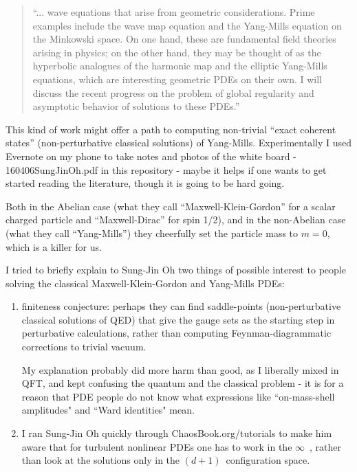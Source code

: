\begin{description}
\begin{quote}
``... wave equations that arise from geometric
considerations. Prime examples include the wave map equation and
the Yang-Mills equation on the Minkowski space. On one hand, these
are fundamental field theories arising in physics; on the other hand,
they may be thought of as the hyperbolic analogues of the harmonic map
and the elliptic Yang-Mills equations, which are interesting geometric
PDEs on their own. I will discuss the recent progress on the problem of
global regularity and asymptotic behavior of solutions to these PDEs.''
\end{quote}

This kind of work might offer a path to computing non-trivial ``exact
coherent states'' (non-perturbative classical solutions) of Yang-Mills.
Experimentally I used Evernote on my phone to take notes and photos of
the white board -
 {160406SungJinOh.pdf} in this repository -
maybe it helps if one wants to get started reading the literature, though
it is going to be hard going.

Both in the Abelian case (what they call ``Maxwell-Klein-Gordon'' for a
scalar charged particle and ``Maxwell-Dirac'' for spin 1/2), and in the
non-Abelian case (what they call ``Yang-Mills'') they cheerfully set the
particle mass to $m=0$, which is a killer for us.

I tried to briefly explain to Sung-Jin Oh two things of possible interest
to people solving the classical Maxwell-Klein-Gordon and Yang-Mills PDEs:

\begin{enumerate}
  \item
{}
{finiteness conjecture}: perhaps they can find saddle-points
(non-perturbative classical solutions of QED) that give the
gauge sets as the starting step in perturbative calculations,
rather than computing Feynman-diagrammatic corrections to trivial vacuum.

My explanation probably did more harm than good, as I liberally mixed in
QFT, and kept confusing the quantum and the classical problem - it is for
a reason that PDE people do not know what expressions like
``on-mass-shell amplitudes" and ``Ward identities" mean.

  \item
I ran Sung-Jin Oh quickly through 
{ChaosBook.org/tutorials} to make him aware that for turbulent nonlinear
PDEs one has to work in the $\infty$\dmn\ \statesp, rather than look at
the solutions only in the $(d+1)$\dmn\ configuration space.


\end{enumerate}
\end{description}
